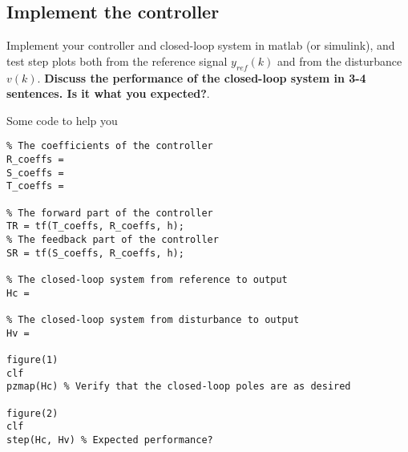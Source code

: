 \documentclass[a4paper]{scrartcl}
\begin{document}
\subsection{Implement the controller}
\label{sec-1-5}
Implement your controller and closed-loop system in matlab (or simulink), and test step plots both from the reference signal $y_{ref}(k)$ and from the disturbance $v(k)$. 
\textbf{Discuss the performance of the closed-loop system in 3-4 sentences. Is it what you expected?}.

Some code to help you
\begin{verbatim}
% The coefficients of the controller
R_coeffs = 
S_coeffs = 
T_coeffs = 

% The forward part of the controller
TR = tf(T_coeffs, R_coeffs, h);
% The feedback part of the controller
SR = tf(S_coeffs, R_coeffs, h);

% The closed-loop system from reference to output
Hc = 

% The closed-loop system from disturbance to output
Hv =  

figure(1)
clf
pzmap(Hc) % Verify that the closed-loop poles are as desired

figure(2)
clf
step(Hc, Hv) % Expected performance?
\end{verbatim}
\end{document}
